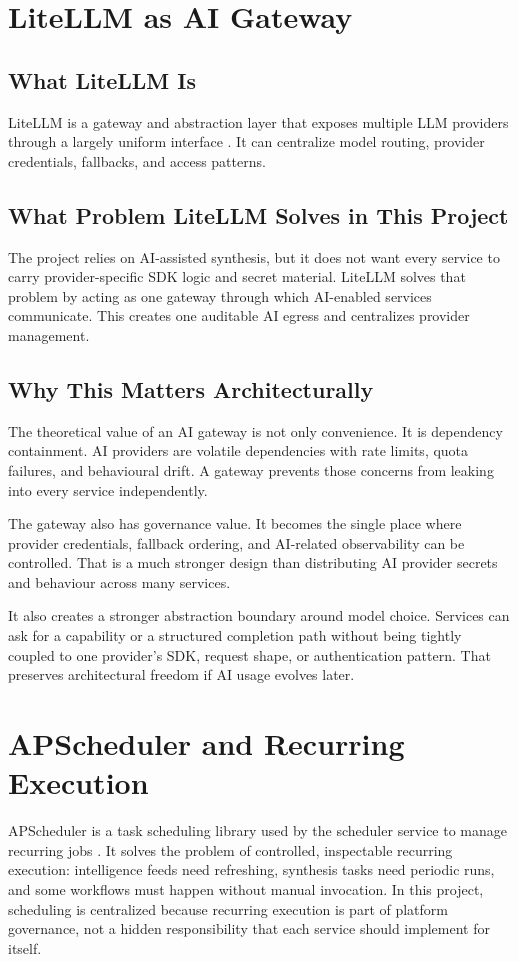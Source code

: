 \section{LiteLLM as AI Gateway}
\subsection{What LiteLLM Is}
LiteLLM is a gateway and abstraction layer that exposes multiple LLM providers through a largely uniform interface \cite{litellm_docs}. It can centralize model routing, provider credentials, fallbacks, and access patterns.

\subsection{What Problem LiteLLM Solves in This Project}
The project relies on AI-assisted synthesis, but it does not want every service to carry provider-specific SDK logic and secret material. LiteLLM solves that problem by acting as one gateway through which AI-enabled services communicate. This creates one auditable AI egress and centralizes provider management.

\subsection{Why This Matters Architecturally}
The theoretical value of an AI gateway is not only convenience. It is dependency containment. AI providers are volatile dependencies with rate limits, quota failures, and behavioural drift. A gateway prevents those concerns from leaking into every service independently.

The gateway also has governance value. It becomes the single place where provider credentials, fallback ordering, and AI-related observability can be controlled. That is a much stronger design than distributing AI provider secrets and behaviour across many services.

It also creates a stronger abstraction boundary around model choice. Services can ask for a capability or a structured completion path without being tightly coupled to one provider's SDK, request shape, or authentication pattern. That preserves architectural freedom if AI usage evolves later.

\section{APScheduler and Recurring Execution}
APScheduler is a task scheduling library used by the scheduler service to manage recurring jobs \cite{apscheduler_docs}. It solves the problem of controlled, inspectable recurring execution: intelligence feeds need refreshing, synthesis tasks need periodic runs, and some workflows must happen without manual invocation. In this project, scheduling is centralized because recurring execution is part of platform governance, not a hidden responsibility that each service should implement for itself.

